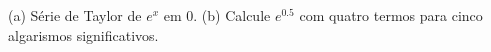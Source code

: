 (a) Série de Taylor de $e^x$ em $0$. (b) Calcule $e^{0.5}$ com quatro termos para cinco algarismos significativos.

